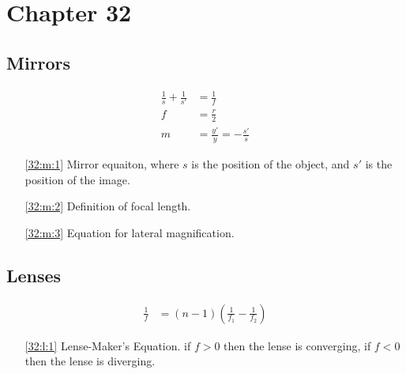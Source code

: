 \documentclass{subfile}
\begin{document}
\section{Chapter 32}
\subsection{Mirrors}
\begin{align}
  \frac{1}{s} + \frac{1}{s'}&=\frac{1}{f} \label{32:m:1}\\
  f &= \frac{r}{2} \label{32:m:2}\\
  m &= \frac{y'}{y} = -\frac{s'}{s} \label{32:m:3}
\end{align}
\begin{enumerate}
  \item[\eqref{32:m:1}] Mirror equaiton, where $s$ is the position of the object, and $s'$ is the position of the image.
  \item[\eqref{32:m:2}] Definition of focal length.
  \item[\eqref{32:m:3}] Equation for lateral magnification.
\end{enumerate}
\subsection{Lenses}
\begin{align}
  \frac{1}{f} &= (n-1)\left(\frac{1}{f_1}-\frac{1}{f_2}\right) \label{32:l:1}
\end{align}
\begin{enumerate}
  \item[\eqref{32:l:1}] Lense-Maker's Equation. if $f>0$ then the lense is converging, if $f<0$ then the lense is diverging.
\end{enumerate}
\end{document}
